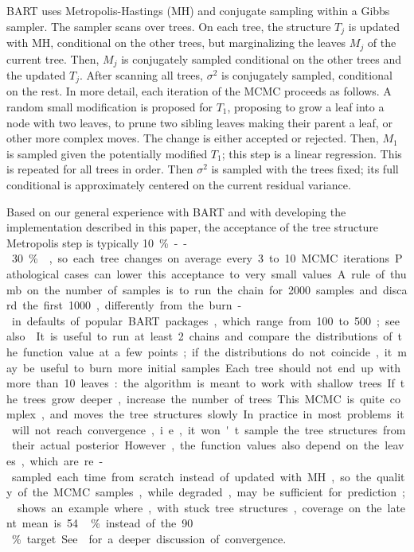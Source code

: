 \documentclass{article}
\begin{document}
BART uses Metropolis-Hastings (MH) and conjugate sampling within a Gibbs sampler. The sampler
scans over trees. On each tree, the structure $T_j$ is updated with MH,
conditional on the other trees, but marginalizing the leaves $M_j$ of the
current tree. Then, $M_j$ is conjugately sampled conditional on the other trees
and the updated $T_j$. After scanning all trees, $\sigma^2$ is conjugately
sampled, conditional on the rest. In more detail, each iteration of the MCMC
proceeds as follows. A random small modification is proposed for $T_1$,
proposing to grow a leaf into a node with two leaves, to prune two sibling
leaves making their parent a leaf, or other more complex moves. The change is
either accepted or rejected. Then, $M_1$ is sampled given the potentially
modified $T_1$; this step is a linear regression. This is repeated for all trees
in order. Then $\sigma^2$ is sampled with the trees fixed; its full conditional is
approximately centered on the current residual variance.

Based on our general experience with BART and with developing the implementation
described in this paper, the acceptance of the tree structure Metropolis step is
typically \SI{10}\%--\SI{30}\% \citep[see also][p.~891]{pratola2016}, so each
tree changes on average every 3 to 10 MCMC iterations. Pathological cases
can lower this acceptance to very small values. A rule of thumb on the number of
samples is to run the chain for 2000 samples and discard the first 1000,
differently from the burn-in defaults of popular BART packages, which range from 100 to
500; see also \textcite[6]{kapelner2016}.
%
%
It is useful to run at least 2 chains and compare the
distributions of the function value at a few points; if the distributions do not
coincide, it may be useful to burn more initial samples. Each tree should not
end up with more than 10 leaves: the algorithm is meant to work with shallow
trees. If the trees grow deeper, increase the number of trees.

This MCMC is quite complex, and moves the tree structures slowly. In practice
in most problems it will not reach convergence, i.e., it won't sample the tree
structures from their actual posterior. However, the function values also
depend on the leaves, which are re-sampled each time from scratch instead of
updated with MH, so the quality of the MCMC samples, while degraded, may be sufficient for
prediction; \textcite[891]{pratola2016} shows an example where, with stuck tree structures, coverage on the latent mean is 54\,\% instead of the 90\,\% target. See \textcite{tan2026computationalefficiencybayesianadditive} for a deeper discussion of convergence.
\end{document}
